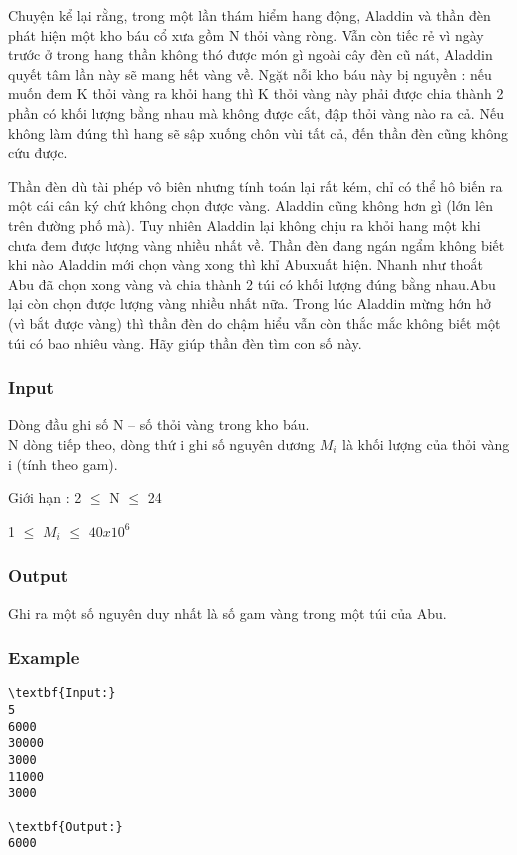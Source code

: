 

Chuyện kể lại rằng, trong một lần thám hiểm hang động, Aladdin và thần đèn phát hiện một kho báu cổ xưa gồm N thỏi vàng ròng. Vẫn còn tiếc rẻ vì ngày trước ở trong hang thần không thó được món gì ngoài cây đèn cũ nát, Aladdin quyết tâm lần này sẽ mang hết vàng về. Ngặt nỗi kho báu này bị nguyền : nếu muốn đem K thỏi vàng ra khỏi hang thì K thỏi vàng này phải được chia thành 2 phần có khối lượng bằng nhau mà không được cắt, đập thỏi vàng nào ra cả. Nếu không làm đúng thì hang sẽ sập xuống chôn vùi tất cả, đến thần đèn cũng không cứu được.

Thần đèn dù tài phép vô biên nhưng tính toán lại rất kém, chỉ có thể hô biến ra một cái cân ký chứ không chọn được vàng. Aladdin cũng không hơn gì (lớn lên trên đường phố mà). Tuy nhiên Aladdin lại không chịu ra khỏi hang một khi chưa đem được lượng vàng nhiều nhất về. Thần đèn đang ngán ngẩm không biết khi nào Aladdin mới chọn vàng xong thì khỉ Abuxuất hiện. Nhanh như thoắt Abu đã chọn xong vàng và chia thành 2 túi có khối lượng đúng bằng nhau.Abu lại còn chọn được lượng vàng nhiều nhất nữa. Trong lúc Aladdin mừng hớn hở (vì bắt được vàng) thì thần đèn do chậm hiểu vẫn còn thắc mắc không biết một túi có bao nhiêu vàng. Hãy giúp thần đèn tìm con số này.

\subsubsection{Input}

Dòng đầu ghi số N – số thỏi vàng trong kho báu.
\\N dòng tiếp theo, dòng thứ i ghi số nguyên dương $M_{i}$ là khối lượng của thỏi vàng i (tính theo gam).

Giới hạn : 2  $\le$  N  $\le$  24

1  $\le$  $M_{i}$  $\le$  $40x10^{6}$

\subsubsection{Output}

Ghi ra một số nguyên duy nhất là số gam vàng trong một túi của Abu.

\subsubsection{Example}
\begin{verbatim}
\textbf{Input:}
5
6000
30000
3000
11000
3000

\textbf{Output:}
6000\end{verbatim}
